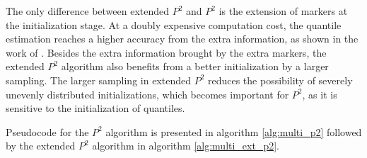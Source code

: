 The only difference between extended $P^2$ and $P^2$ is the extension of markers at the initialization stage. At a doubly expensive computation cost, the quantile estimation reaches a higher accuracy from the extra information, as shown in the work of \citeauthor{raatikainenSequentialProcedureSimultaneous1993}\cite{raatikainenSequentialProcedureSimultaneous1993}. Besides the extra information brought by the extra markers, the extended $P^2$ algorithm also benefits from a better initialization by a larger sampling. The larger sampling in extended $P^2$ reduces the possibility of severely unevenly distributed initializations, which becomes important for  $P^2$, as it is sensitive to the initialization of quantiles.

Pseudocode for the $P^2$ algorithm is presented in algorithm \ref{alg:multi_p2} followed by the extended $P^2$ algorithm in algorithm \ref{alg:multi_ext_p2}.
